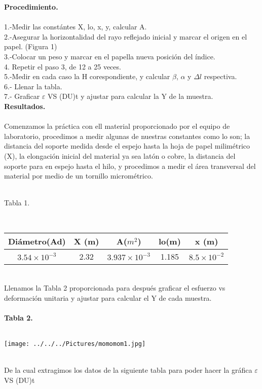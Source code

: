 \documentclass[10pt,a4paper]{article}
\begin{document}
\textbf{Procedimiento.}\\
\\
1.-Medir las const\'{a}ntes X, lo, x, y, calcular A.\\
2.-Asegurar la horizontalidad del rayo reflejado inicial y marcar el origen en el papel. (Figura 1)\\
3.-Colocar un peso y marcar en el papella nueva posici\'{o}n del \'{i}ndice. \\
4. Repetir el paso 3, de 12 a 25 veces.\\
5.-Medir en cada caso la H corespondiente, y calcular $\beta$, $\alpha$ y $\Delta l$ respectiva.\\
6.- Llenar la tabla.\\
7.- Graficar $\varepsilon$ VS (DU)t y ajustar para calcular la Y de la muestra.\\

\textbf{Resultados.}\\
\\
Comenzamos la pr\'{a}ctica con ell material proporcionado por el equipo de laboratorio, procedimos a medir algunas de nuestras constantes como lo son; la distancia del soporte medida desde el espejo hasta la hoja de papel milim\'{e}trico (X), la elongaci\'{o}n inicial del material ya sea lat\'{o}n o cobre, la distancia del soporte para en espejo hasta el hilo, y procedimos a medir el \'{a}rea transversal del material por medio de un tornillo microm\'{e}trico. \\
\medskip
\\
\medskip
\caption{Tabla 1.} 
\\ 
\begin{tabular}{|c|c|c|c|c|}
\hline 
Di\'{a}metro(Ad) & X (m) & A(${ m }^{ 2 }$) & lo(m)& x (m)\\ 
\hline 
${ 3.54\times 10 }^{ -3 }$ & 2.32 & ${ 3.937\times 10 }^{ -3 }$ & 1.185 &${ 8.5\times 10 }^{ -2 }$ \\
\hline 
\end{tabular}\\

\medskip
Llenamos la Tabla 2 proporcionada para despu\'{e}s graficar el esfuerzo vs deformaci\'{o}n unitaria y ajustar para calcular el Y de cada muestra.\\
\\
\textbf{Tabla 2.}\\
\\
\begin{figure 2}
\centering
\texttt{[image: ../../../Pictures/momomom1.jpg]} 
\\
\end{figure 2}
\\
De la cual extragimos los datos de la siguiente tabla para poder hacer la gr\'{a}fica $\varepsilon$ VS (DU)t
 
\end{document}
